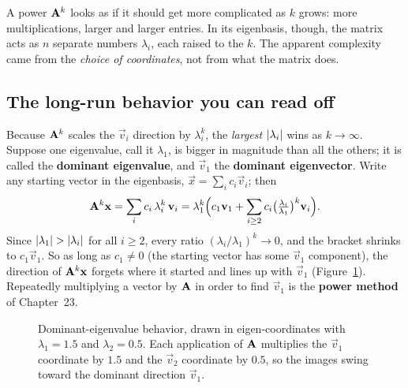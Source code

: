 \begin{aestheticbox}
A power $\mathbf{A}^k$ looks as if it should get more complicated as $k$ grows:
more multiplications, larger and larger entries. In its eigenbasis, though, the
matrix acts as $n$ separate numbers $\lambda_i$, each raised to the $k$. The
apparent complexity came from the \emph{choice of coordinates}, not from what
the matrix does.
\end{aestheticbox}

\subsection{The long-run behavior you can read off}
\label{ch24:longrun}

Because $\mathbf{A}^k$ scales the $\vec{v}_i$ direction by $\lambda_i^k$, the
\emph{largest} $\lvert\lambda_i\rvert$ wins as $k\to\infty$. Suppose one eigenvalue,
call it $\lambda_1$, is bigger in magnitude than all the others; it is called the
\textbf{dominant eigenvalue}, and $\vec{v}_1$ the \textbf{dominant eigenvector}.
Write any starting vector in the eigenbasis, $\vec{x} = \sum_i c_i\vec{v}_i$; then
\[
  \mathbf{A}^k\mathbf{x} = \sum_i c_i\,\lambda_i^k\,\mathbf{v}_i
  = \lambda_1^k\Big( c_1\mathbf{v}_1 + \sum_{i\ge 2} c_i\big(\tfrac{\lambda_i}{\lambda_1}\big)^k\mathbf{v}_i\Big).
\]
Since $\lvert\lambda_1\rvert > \lvert\lambda_i\rvert$ for all $i\ge2$, every ratio
$(\lambda_i/\lambda_1)^k \to 0$, and the bracket shrinks to $c_1\vec{v}_1$. So
as long as $c_1\neq0$ (the starting vector has some $\vec{v}_1$ component), the
direction of $\mathbf{A}^k\mathbf{x}$ forgets where it started and lines up with
$\vec{v}_1$ (Figure~\ref{ch24:fig-dominant}). Repeatedly multiplying a vector
by $\mathbf{A}$ in order to find $\vec{v}_1$ is the \textbf{power method} of Chapter~23.

\begin{figure}[H]
\centering
{}
\caption{Dominant-eigenvalue behavior, drawn in eigen-coordinates with
$\lambda_1 = 1.5$ and $\lambda_2 = 0.5$. Each application of $\mathbf{A}$ multiplies
the $\vec{v}_1$ coordinate by $1.5$ and the $\vec{v}_2$ coordinate by $0.5$, so
the images swing toward the dominant direction $\vec{v}_1$.}
\label{ch24:fig-dominant}
\end{figure}


